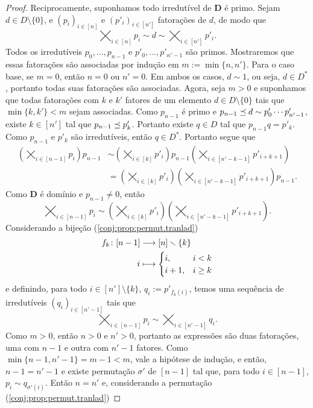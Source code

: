 \begin{proof}
Reciprocamente, suponhamos todo irredutível de $\bm D$ é primo. Sejam $d \in D \setminus \{0\}$, e $(p_i)_{i \in [n]}$ e $(p'_i)_{i \in [n']}$ fatorações de $d$, de modo que
	\begin{equation*}
	\bigtimes_{i \in [n]} p_i \sim d \sim \bigtimes_{i \in [n']} p'_i.
	\end{equation*}
Todos os irredutíveis $p_0,\ldots,p_{n-1}$ e $p'_0,\ldots,p'_{n'-1}$ são primos. Mostraremos que essas fatorações são associadas por indução em $m := \min\{n,n'\}$. Para o caso base, se $m=0$, então $n=0$ ou $n'=0$. Em ambos os casos, $d \sim 1$, ou seja, $d \in D^*$, portanto todas suas fatorações são associadas. Agora, seja $m > 0$ e suponhamos que todas fatorações com $k$ e $k'$ fatores de um elemento $d \in D \setminus \{0\}$ tais que $\min\{k,k'\}<m$ sejam associadas. Como $p_{n-1}$ é primo  e $p_{n-1} \preceq d \sim p'_0 \cdots p'_{n'-1}$, existe $k \in [n']$ tal que $p_{n-1} \preceq p'_k$. Portanto existe $q \in D$ tal que $p_{n-1}q = p'_k$. Como $p_{n-1}$ e $p'_k$ são irredutíveis, então $q \in D^*$. Portanto segue que
	\begin{align*}
	\left( \bigtimes_{i \in [n-1]} p_i \right) p_{n-1} &\sim \left( \bigtimes_{i \in [k]} p'_i \right) p_{n-1} \left( \bigtimes_{i \in [n'-k-1]} p'_{i+k+1} \right) \\
		&= \left( \bigtimes_{i \in [k]} p'_i \right)\left( \bigtimes_{i \in [n'-k-1]} p'_{i+k+1} \right) p_{n-1}.
	\end{align*}
Como $\bm D$ é domínio e $p_{n-1} \neq 0$, então
	\begin{equation*}
	\bigtimes_{i \in [n-1]} p_i \sim \left( \bigtimes_{i \in [k]} p'_i \right) \left( \bigtimes_{i \in [n'-k-1]} p'_{i+k+1} \right).
	\end{equation*}
Considerando a bijeção (\ref{conj:prop:permut.tranlad})
	\begin{align*}
	{f_k}\colon {[n-1]} &\longrightarrow {[n]\smallsetminus\{k\}} \\{i} &\longmapsto \begin{cases}
		i,& i < k \\
		i+1,& i \geq k
		\end{cases}
	\end{align*}
 e definindo, para todo $i \in [n'] \setminus \{k\}$, $q_i := p'_{f_k(i)}$, temos uma sequência de irredutíveis $(q_i)_{i \in [n'-1]}$ tais que
	\begin{equation*}
	\bigtimes_{i \in [n-1]} p_i \sim \bigtimes_{i \in [n'-1]} q_i.
	\end{equation*}
Como $m>0$, então $n>0$ e $n'>0$, portanto as expressões são duas fatorações, uma com $n-1$ e outra com $n'-1$ fatores. Como $\min\{n-1,n'-1\} = m-1 < m$, vale a hipótese de indução, e então, $n-1=n'-1$ e existe permutação $\sigma'$ de $[n-1]$ tal que, para todo $i \in [n-1]$, $p_i \sim q_{\sigma'(i)}$. Então  $n=n'$ e, considerando a permutação (\ref{conj:prop:permut.tranlad})

\end{proof}

